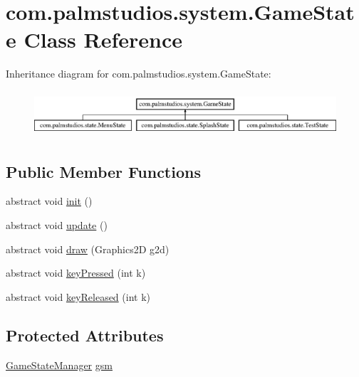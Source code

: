\hypertarget{classcom_1_1palmstudios_1_1system_1_1_game_state}{}\section{com.\+palmstudios.\+system.\+Game\+State Class Reference}
\label{classcom_1_1palmstudios_1_1system_1_1_game_state}
Inheritance diagram for com.\+palmstudios.\+system.\+Game\+State\+:\begin{figure}[H]
\begin{center}
\leavevmode
\includegraphics[height=1.712538cm]{classcom_1_1palmstudios_1_1system_1_1_game_state}
\end{center}
\end{figure}
\subsection*{Public Member Functions}
\begin{DoxyCompactItemize}
\item 
abstract void \hyperlink{classcom_1_1palmstudios_1_1system_1_1_game_state_aefc8099403a9b7a8c133e4311becc24b}{init} ()
\item 
abstract void \hyperlink{classcom_1_1palmstudios_1_1system_1_1_game_state_ab0c16142641d8bc358bbdc739018919f}{update} ()
\item 
abstract void \hyperlink{classcom_1_1palmstudios_1_1system_1_1_game_state_ae1b37576ee7080b342860a9756969e29}{draw} (Graphics2D g2d)
\item 
abstract void \hyperlink{classcom_1_1palmstudios_1_1system_1_1_game_state_ad4df5919475841d760301dfd329aab1a}{key\+Pressed} (int k)
\item 
abstract void \hyperlink{classcom_1_1palmstudios_1_1system_1_1_game_state_aef789ef42241822e413aa4ea5c76aa45}{key\+Released} (int k)
\end{DoxyCompactItemize}
\subsection*{Protected Attributes}
\begin{DoxyCompactItemize}
\item 
\hyperlink{classcom_1_1palmstudios_1_1state_1_1_game_state_manager}{Game\+State\+Manager} \hyperlink{classcom_1_1palmstudios_1_1system_1_1_game_state_a3a9b05fb9a962eabae260371069a79eb}{gsm}
\end{DoxyCompactItemize}


